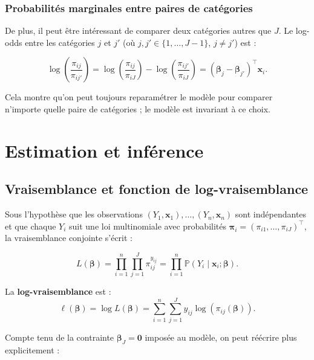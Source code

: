 \documentclass[12pt,a4paper]{article}
\begin{document}
\subsubsection{Probabilités marginales entre paires de catégories}

De plus, il peut être intéressant de comparer deux catégories autres que $J$. Le log-odds entre les catégories $j$ et $j'$ (où $j, j' \in \{1, \ldots, J-1\}$, $j \neq j'$) est :

\begin{equation}
\log\left(\frac{\pi_{ij}}{\pi_{ij'}}\right) = \log\left(\frac{\pi_{ij}}{\pi_{iJ}}\right) - \log\left(\frac{\pi_{ij'}}{\pi_{iJ}}\right) = (\boldsymbol{\beta}_j - \boldsymbol{\beta}_{j'})^\top \mathbf{x}_i.
\end{equation}

Cela montre qu'on peut toujours reparamétrer le modèle pour comparer n'importe quelle paire de catégories ; le modèle est invariant à ce choix.

\section{Estimation et inférence}

\subsection{Vraisemblance et fonction de log-vraisemblance}

Sous l'hypothèse que les observations $(Y_1, \mathbf{x}_1), \ldots, (Y_n, \mathbf{x}_n)$ sont indépendantes et que chaque $Y_i$ suit une loi multinomiale avec probabilités $\boldsymbol{\pi}_i = (\pi_{i1}, \ldots, \pi_{iJ})^\top$, la vraisemblance conjointe s'écrit :

\begin{equation}
L(\boldsymbol{\beta}) = \prod_{i=1}^{n} \prod_{j=1}^{J} \pi_{ij}^{y_{ij}} = \prod_{i=1}^{n} \mathbb{P}(Y_i \mid \mathbf{x}_i; \boldsymbol{\beta}).
\end{equation}

La \textbf{log-vraisemblance} est :
\begin{equation}\label{eq:loglikelihood}
\ell(\boldsymbol{\beta}) = \log L(\boldsymbol{\beta}) = \sum_{i=1}^{n} \sum_{j=1}^{J} y_{ij} \log(\pi_{ij}(\boldsymbol{\beta})).
\end{equation}

Compte tenu de la contrainte $\boldsymbol{\beta}_J = \mathbf{0}$ imposée au modèle, on peut réécrire plus explicitement :
\end{document}
